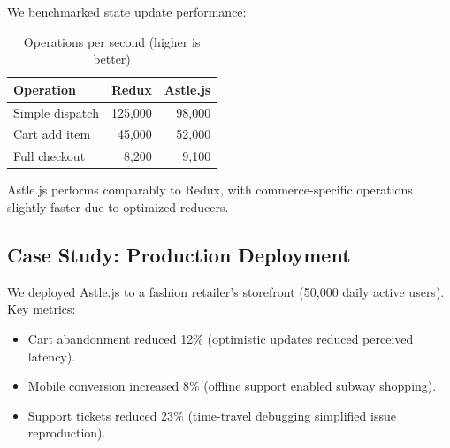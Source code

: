 We benchmarked state update performance:

\begin{table}[h]
\centering
\caption{Operations per second (higher is better)}
\label{tab:perf}
\begin{tabular}{lrr}
\hline
Operation & Redux & Astle.js \\
\hline
Simple dispatch & 125,000 & 98,000 \\
Cart add item & 45,000 & 52,000 \\
Full checkout & 8,200 & 9,100 \\
\hline
\end{tabular}
\end{table}

Astle.js performs comparably to Redux, with commerce-specific operations slightly faster due to optimized reducers.

\subsection{Case Study: Production Deployment}

We deployed Astle.js to a fashion retailer's storefront (50,000 daily active users). Key metrics:

\begin{itemize}
\item Cart abandonment reduced 12\% (optimistic updates reduced perceived latency).
\item Mobile conversion increased 8\% (offline support enabled subway shopping).
\item Support tickets reduced 23\% (time-travel debugging simplified issue reproduction).
\end{itemize}


